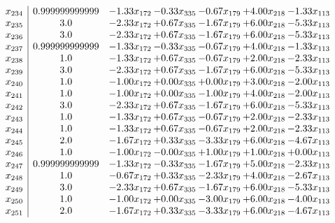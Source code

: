 \documentclass[8pt]{article}
\begin{document}
\[\begin{array}{c| c c@{\hskip 2pt} c@{\hskip 2pt} c@{\hskip 2pt} c@{\hskip 2pt} c@{\hskip 2pt} }
 x_{234}   &  0.999999999999 & -1.33 x_{172} & -0.33 x_{335} & -0.67 x_{179} & +  4.00 x_{218} & -1.33 x_{113}\\
 x_{235}   &  3.0 & -2.33 x_{172} & +  0.67 x_{335} & -1.67 x_{179} & +  6.00 x_{218} & -5.33 x_{113}\\
 x_{236}   &  3.0 & -2.33 x_{172} & +  0.67 x_{335} & -1.67 x_{179} & +  6.00 x_{218} & -5.33 x_{113}\\
 x_{237}   &  0.999999999999 & -1.33 x_{172} & -0.33 x_{335} & -0.67 x_{179} & +  4.00 x_{218} & -1.33 x_{113}\\
 x_{238}   &  1.0 & -1.33 x_{172} & +  0.67 x_{335} & -0.67 x_{179} & +  2.00 x_{218} & -2.33 x_{113}\\
 x_{239}   &  3.0 & -2.33 x_{172} & +  0.67 x_{335} & -1.67 x_{179} & +  6.00 x_{218} & -5.33 x_{113}\\
 x_{240}   &  1.0 & -1.00 x_{172} & +  0.00 x_{335} & +  0.00 x_{179} & +  3.00 x_{218} & -2.00 x_{113}\\
 x_{241}   &  1.0 & -1.00 x_{172} & +  0.00 x_{335} & -1.00 x_{179} & +  4.00 x_{218} & -2.00 x_{113}\\
 x_{242}   &  3.0 & -2.33 x_{172} & +  0.67 x_{335} & -1.67 x_{179} & +  6.00 x_{218} & -5.33 x_{113}\\
 x_{243}   &  1.0 & -1.33 x_{172} & +  0.67 x_{335} & -0.67 x_{179} & +  2.00 x_{218} & -2.33 x_{113}\\
 x_{244}   &  1.0 & -1.33 x_{172} & +  0.67 x_{335} & -0.67 x_{179} & +  2.00 x_{218} & -2.33 x_{113}\\
 x_{245}   &  2.0 & -1.67 x_{172} & +  0.33 x_{335} & -3.33 x_{179} & +  6.00 x_{218} & -4.67 x_{113}\\
 x_{246}   &  1.0 & -1.00 x_{172} & -0.00 x_{335} & +  1.00 x_{179} & +  1.00 x_{218} & +  0.00 x_{113}\\
 x_{247}   &  0.999999999999 & -1.33 x_{172} & -0.33 x_{335} & -1.67 x_{179} & +  5.00 x_{218} & -2.33 x_{113}\\
 x_{248}   &  1.0 & -0.67 x_{172} & +  0.33 x_{335} & -2.33 x_{179} & +  4.00 x_{218} & -2.67 x_{113}\\
 x_{249}   &  3.0 & -2.33 x_{172} & +  0.67 x_{335} & -1.67 x_{179} & +  6.00 x_{218} & -5.33 x_{113}\\
 x_{250}   &  1.0 & -1.00 x_{172} & +  0.00 x_{335} & -3.00 x_{179} & +  6.00 x_{218} & -4.00 x_{113}\\
 x_{251}   &  2.0 & -1.67 x_{172} & +  0.33 x_{335} & -3.33 x_{179} & +  6.00 x_{218} & -4.67 x_{113}\\

\end{array}\]
\end{document}
